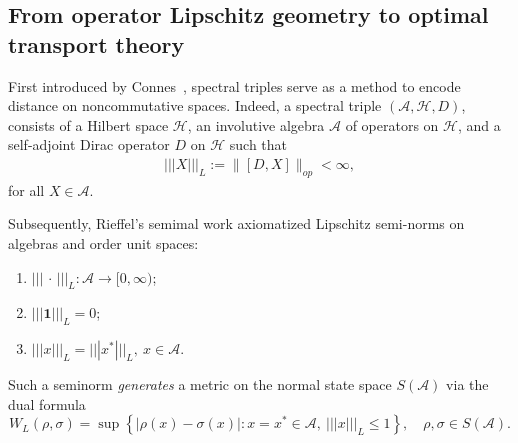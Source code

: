 \documentclass[11pt,reqno]{amsart}
\numberwithin{equation}{section}
\newcommand{\mc}{\mathcal}
\begin{document}
\subsection{From operator Lipschitz geometry to optimal transport theory}
First introduced by Connes~\cite{connes1992metric}, spectral triples serve as a method to encode distance on noncommutative spaces. Indeed, a spectral triple $(\mc A, \mathcal{H}, D)$, consists of a Hilbert space $\mathcal{H}$, an involutive algebra $\mc A$ of operators on $\mathcal{H}$, and a self-adjoint Dirac operator $D$ on $\mathcal{H}$ such that 
\begin{align*}
    |||X|||_L := \|[D,X]\|_{op} < \infty, 
\end{align*}
for all $X \in \mc A$. 

Subsequently, Rieffel's semimal work \cite{rieffel1999metrics,rieffel2004compact} axiomatized Lipschitz semi-norms on algebras and order unit spaces: 
\begin{enumerate}
    \item[(0)] $  |||\,\cdot\,|||_{L}:\mc A\longrightarrow[0,\infty)$;
    \item[(1)] $|||\textbf{1}|||_{L}=0$;
    \item[(2)] $|||x|||_{L}=|||x^{*}|||_{L},\ x \in \mc A$.  
\end{enumerate}
Such a seminorm \emph{generates} a metric on the normal state space $S(\mc A)$ via the dual formula
\begin{equation}\label{def:distance seminorm}
  W_{L}(\rho,\sigma) = \sup\left\{
       |\rho(x)-\sigma(x)|:x=x^{*}\in\mc A,\ |||x|||_{L}\le1 \right\},
  \quad
  \rho,\sigma\in S(\mc A).
\end{equation}

\end{document}
